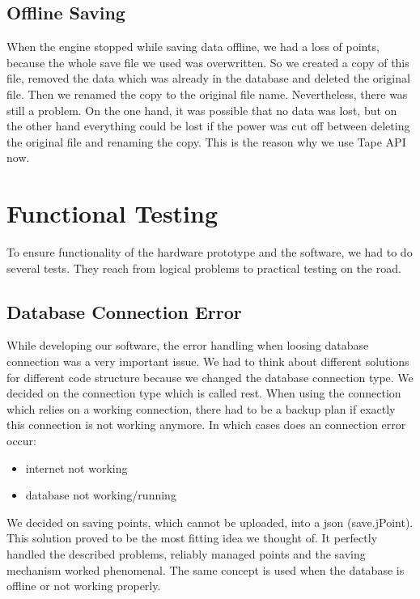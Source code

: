 \subsection{Offline Saving}
When the engine stopped while saving data offline, we had a loss of points, because the whole save file we used was overwritten. So we created a copy of this file, removed the data which was already in the database and deleted the original file. Then we renamed the copy to the original file name. Nevertheless, there was still a problem. On the one hand, it was possible that no data was lost, but on the other hand everything could be lost if the power was cut off between deleting the original file and renaming the copy. This is the reason why we use Tape API now. 
\section{Functional Testing}
To ensure functionality of the hardware prototype and the software, we had to do several tests. They reach from logical problems to practical testing on the road.
\subsection{Database Connection Error}
While developing our software, the error handling when loosing database connection was a very important issue. We had to think about different solutions for different code structure because we changed the database connection type. 
\newline \newline
We decided on the connection type which is called \gls{rest}. When using the connection which relies on a working connection, there had to be a backup plan if exactly this connection is not working anymore.
\newline \newline
In which cases does an connection error occur:
\begin{itemize}
\item internet not working
\item database not working/running
\end{itemize}
We decided on saving points, which cannot be uploaded, into a \gls{json} (save.jPoint). This solution proved to be the most fitting idea we thought of. It perfectly handled the described problems, reliably managed points and the saving mechanism worked phenomenal.
\newline \newline
The same concept is used when the database is offline or not working properly. 

